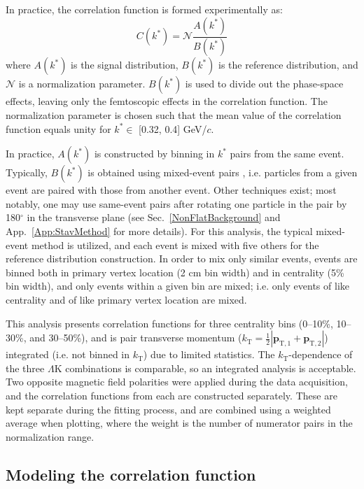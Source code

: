 \documentclass[ALICE,manyauthors]{cernphprep}
\newcommand{\kstar}{$k^{*}$\xspace}
\newcommand{\LamK}{$\Lambda$K\xspace}
\begin{document}
In practice, the correlation function is formed experimentally as:
\begin{equation}
  C(k^{*}) = \mathcal{N}\frac{A(k^{*})}{B(k^{*})}
\label{eqn:CfExp}
\end{equation}
where $A(k^{*})$ is the signal distribution, $B(k^{*})$ is the reference distribution, and $\mathcal{N}$ is a normalization parameter.  
$B(k^{*})$ is used to divide out the phase-space effects, leaving only the femtoscopic effects in the correlation function. 
The normalization parameter is chosen such that the mean value of the correlation function equals unity for \kstar $\in$ [0.32, 0.4] GeV/$c$.


In practice, $A(k^{*})$ is constructed by binning in \kstar pairs from the same event.
Typically, $B(k^{*})$ is obtained using mixed-event pairs \cite{Kopylov:1974th}, i.e. particles from a given event are paired with those from another event.
Other techniques exist; most notably, one may use same-event pairs after rotating one particle in the pair by 180$^\circ$ in the transverse plane (see Sec.\ \ref{NonFlatBackground} and App.\ \ref{App:StavMethod} for more details).
For this analysis, the typical mixed-event method is utilized, and each event is mixed with five others for the reference distribution construction.
In order to mix only similar events, events are binned both in primary vertex location (2 cm bin width) and in centrality (5\% bin width), and only events within a given bin are mixed; i.e. only events of like centrality and of like primary vertex location are mixed.

This analysis presents correlation functions for three centrality bins (0--10\%, 10--30\%, and 30--50\%), and is pair transverse momentum ($k_{\mathrm{T}} = \frac{1}{2}|\mathbf{p}_{\mathrm{T,1}}+\mathbf{p}_{\mathrm{T,2}}|$) integrated (i.e. not binned in $k_{\mathrm{T}}$) due to limited statistics.
The $k_{\mathrm{T}}$-dependence of the three \LamK combinations is comparable, so an integrated analysis is acceptable.
Two opposite magnetic field polarities were applied during the data acquisition, and the correlation functions from each are constructed separately.
These are kept separate during the fitting process, and are combined using a weighted average when plotting, where the weight is the number of numerator pairs in the normalization range.

\subsection{Modeling the correlation function}
\label{sec:ModelingCF}
\end{document}
